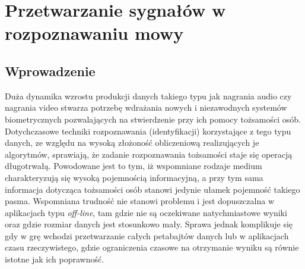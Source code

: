 \chapter{Przetwarzanie sygnałów w rozpoznawaniu mowy}

\section{Wprowadzenie}

Duża dynamika wzrostu produkcji danych takiego typu jak nagrania audio czy nagrania video stwarza potrzebę wdrażania nowych i niezawodnych systemów biometrycznych pozwalających na stwierdzenie przy ich pomocy tożsamości osób. Dotychczasowe techniki rozpoznawania (identyfikacji) korzystające z tego typu danych, ze względu na wysoką złożoność obliczeniową realizujących je algorytmów, sprawiają, że zadanie rozpoznawania tożsamości staje się operacją długotrwałą. Powodowane jest to tym, iż wspomniane
rodzaje medium charakteryzują się wysoką pojemnością informacyjną, a przy tym sama informacja dotycząca tożsamości osób stanowi jedynie ułamek pojemność takiego pasma. Wspomniana trudność nie stanowi problemu i jest dopuszczalna w aplikacjach typu \textit{off-line}, tam gdzie nie są oczekiwane natychmiastowe wyniki oraz gdzie rozmiar danych jest stosunkowo mały. Sprawa jednak komplikuje się gdy w grę wchodzi przetwarzanie całych petabajtów danych lub w aplikacjach czasu rzeczywistego, gdzie ograniczenia czasowe na otrzymanie wyniku są równie istotne jak ich poprawność.

